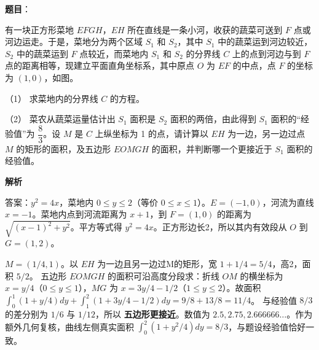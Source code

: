 \begin{answer}

\textbf{题目}：

有一块正方形菜地 \(EFGH\)，\(EH\) 所在直线是一条小河，收获的蔬菜可送到 \(F\) 点或河边运走。于是，菜地分为两个区域 \(S_1\) 和 \(S_2\)，其中 \(S_1\) 中的蔬菜运到河边较近，\(S_2\) 中的蔬菜运到 \(F\) 点较近，而菜地内 \(S_1\) 和 \(S_2\) 的分界线 \(C\) 上的点到河边与到 \(F\) 点的距离相等，现建立平面直角坐标系，其中原点 \(O\) 为 \(EF\) 的中点，点 \(F\) 的坐标为 \((1,0)\)，如图。

（1） 求菜地内的分界线 \(C\) 的方程。

（2） 菜农从蔬菜运量估计出 \(S_1\) 面积是 \(S_2\) 面积的两倍，由此得到 \(S_1\) 面积的“经验值”为 \(\dfrac83\)。设 \(M\) 是 \(C\) 上纵坐标为 1 的点，请计算以 \(EH\) 为一边，另一边过点 \(M\) 的矩形的面积，及五边形 \(EOMGH\) 的面积，并判断哪一个更接近于 \(S_1\) 面积的经验值。
\nopagebreak[4]
\begin{center}\end{center}
\nopagebreak[4]
\textbf{解析}


答案：\(y^2=4x\)，菜地内 \(0\le y\le2\)（等价 \(0\le x\le1\)）。\(E=(-1,0)\)，河流为直线 \(x=-1\)。菜地内点到河流距离为 \(x+1\)，到 \(F=(1,0)\) 的距离为 \(\sqrt{(x-1)^2+y^2}\)。平方等式得 \(y^2=4x\)。正方形边长2，所以其内有效段从 \(O\) 到 \(G=(1,2)\)。


\(M=(1/4,1)\)。以 \(EH\) 为一边且另一边过M的矩形，宽 \(1+1/4=5/4\)，高2，面积 \(5/2\)。
五边形 \(EOMGH\) 的面积可沿高度分段求：折线 \(OM\) 的横坐标为 \(x=y/4\)（\(0\le y\le1\)），\(MG\) 为 \(x=3y/4-1/2\)（\(1\le y\le2\)）。故面积
\(\int_0^1(1+y/4)dy+\int_1^2(1+3y/4-1/2)dy=9/8+13/8=11/4\)。
与经验值 \(8/3\) 的差分别为 \(1/6\) 与 \(1/12\)，所以 \textbf{五边形更接近}。数值为 \(2.5,2.75,2.666666\ldots\)。作为额外几何复核，曲线左侧真实面积 \(\int_0^2(1+y^2/4)dy=8/3\)，与题设经验值恰好一致。



\end{answer}
